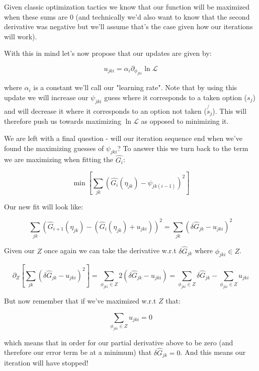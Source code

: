 \documentclass[11pt]{article}
\begin{document}
Given classic optimization tactics we know that our function will be maximized when these sums are $0$ (and technically we'd also want to know that the second derivative was negative but we'll assume that's the case given how our iterations will work). \newline

With this in mind let's now propose that our updates are given by:

$$u_{jki} = \alpha_i \partial_{\phi_{jki}} \ln{\mathcal{L}} $$

where $\alpha_i$ is a constant we'll call our "learning rate". Note that by using this update we will increase our $\psi_{jki}$ guess where it corresponds to a taken option ($s_j$) and will decrease it where it corresponds to an option not taken ($\not{s_j}$). This will therefore push us towards maximizing $\ln{\mathcal{L}}$ as opposed to minimizing it. \newline

We are left with a final question - will our iteration sequence end when we've found the maximizing guesses of $\psi_{jki}$? To answer this we turn back to the term we are maximizing when fitting the $\hat{G_i}$: 

$$\min{\left[ \sum_{jk}\left(\hat{G_i}(\eta_{jk}) - \psi_{jk(i-1)}\right)^2 \right]}$$

Our new fit will look like:

$$\sum_{jk}\left(\hat{G}_{i+1}(\eta_{jk}) - (\hat{G}_i(\eta_{jk}) + u_{jki})\right)^2=\sum_{jk}\left( \delta \hat{G}_{jk} - u_{jki}\right)^2$$

Given our $Z$ once again we can take the derivative w.r.t $\delta \hat{G}_{jk}$ where $\phi_{jki} \in Z$. 

$$\partial_Z \left[ \sum_{jk}\left( \delta \hat{G}_{jk} - u_{jki}\right)^2 \right] = \sum_{\phi_{jki} \in Z} 2\left( \delta \hat{G}_{jk} - u_{jki}\right) = \sum_{\phi_{jki} \in Z} \delta \hat{G}_{jk} - \sum_{\phi_{jki} \in Z} u_{jki}$$

But now remember that if we've maximized w.r.t $Z$ that:

$$\sum_{\phi_{jki} \in Z} u_{jki} = 0$$

which means that in order for our partial derivative above to be zero (and therefore our error term be at a minimum) that $\delta \hat{G}_{jk}=0$. And this means our iteration will have stopped! 

\newpage
\end{document}
